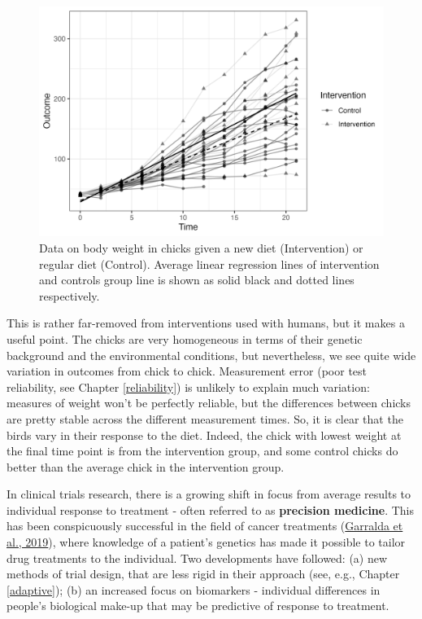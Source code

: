 \documentclass{krantz}
\begin{document}
\begin{figure}
\includegraphics[width=0.9\linewidth]{images_bw/interventionhet} \caption{Data on body weight in chicks given a new diet (Intervention) or regular diet (Control). Average linear regression lines of intervention and controls group line is shown as solid black and dotted lines respectively.}\label{fig:interventionhet}
\end{figure}

This is rather far-removed from interventions used with humans, but it makes a useful point. The chicks are very homogeneous in terms of their genetic background and the environmental conditions, but nevertheless, we see quite wide variation in outcomes from chick to chick. Measurement error (poor test reliability, see Chapter \ref{reliability}) is unlikely to explain much variation: measures of weight won't be perfectly reliable, but the differences between chicks are pretty stable across the different measurement times. So, it is clear that the birds vary in their response to the diet. Indeed, the chick with lowest weight at the final time point is from the intervention group, and some control chicks do better than the average chick in the intervention group.

In clinical trials research, there is a growing shift in focus from average results to individual response to treatment - often referred to as \textbf{precision medicine}. This has been conspicuously successful in the field of cancer treatments (\protect\hyperlink{ref-garralda2019}{Garralda et al., 2019}), where knowledge of a patient's genetics has made it possible to tailor drug treatments to the individual. Two developments have followed: (a) new methods of trial design, that are less rigid in their approach (see, e.g., Chapter \ref{adaptive}); (b) an increased focus on biomarkers - individual differences in people's biological make-up that may be predictive of response to treatment.
\end{document}
